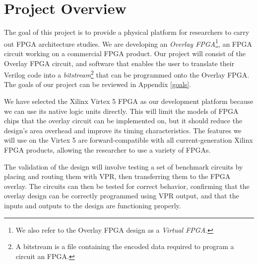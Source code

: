 \section{Project Overview}


The goal of this project is to provide a physical platform for researchers to carry out FPGA architecture studies.
We are developing an \emph{Overlay FPGA}\footnote{We also refer to the Overlay FPGA design as a \emph{Virtual FPGA}.}, an FPGA circuit working on a commercial FPGA product.
Our project will consist of the Overlay FPGA circuit, and software that enables the user to translate their Verilog code into a \emph{bitstream}\footnote{A bitstream is a file containing the encoded data required to program a circuit an FPGA.} that can be programmed onto the Overlay FPGA.
The goals of our project can be reviewed in Appendix \ref{goals}.

We have selected the Xilinx Virtex 5 FPGA as our development platform because we can
use its native logic units directly. This will limit the models of FPGA chips that the overlay
circuit can be implemented on, but it should reduce the design's area overhead and improve
its timing characteristics. The features we will use on the Virtex 5 are forward-compatible
with all current-generation Xilinx FPGA products, allowing the researcher to use a variety
of FPGAs.

The validation of the design will involve testing a set of benchmark circuits by placing and
routing them with VPR, then transferring them to the FPGA overlay. The circuits can
then be tested for correct behavior, confirming that the overlay design can be correctly programmed using VPR output, and that the inputs and outputs to the design are functioning
properly.


